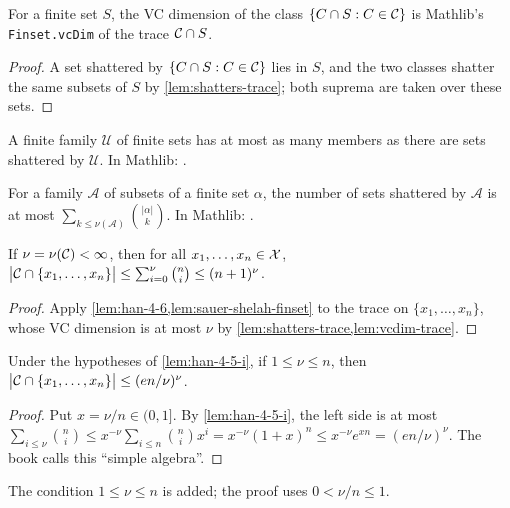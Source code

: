 \begin{lemma}
  \label{lem:vcdim-trace}
  For a finite set $S$, the VC dimension of the class $\{C\cap S:C\in\mathcal{C}\}$ is Mathlib's \texttt{Finset.vcDim} of the trace $\mathcal{C}\cap S$.
\end{lemma}
\begin{proof}
  A set shattered by $\{C\cap S:C\in\mathcal{C}\}$ lies in $S$, and the two classes shatter the same subsets of $S$ by \cref{lem:shatters-trace}; both suprema are taken over these sets.
\end{proof}

\begin{lemma}
  \label{lem:han-4-6}
  \mathlibok
  A finite family $\mathcal U$ of finite sets has at most as many members as there are sets shattered by $\mathcal U$.
  In Mathlib: .
\end{lemma}

\begin{lemma}
  \label{lem:sauer-shelah-finset}
  \mathlibok
  For a family $\mathcal A$ of subsets of a finite set $\alpha$, the number of sets shattered by $\mathcal A$ is at most $\sum_{k\le\nu(\mathcal A)}\binom{|\alpha|}{k}$.
  In Mathlib: .
\end{lemma}

\begin{lemma}
  \label{lem:han-4-5-i}
  If $\nu=\nu(\mathcal{C})<\infty$, then for all $x_1,\dots,x_n\in\mathcal{X}$,
  $\bigl|\mathcal{C}\cap\{x_1,\dots,x_n\}\bigr|\le\sum_{i=0}^{\nu}\binom ni\le(n+1)^\nu$.
\end{lemma}
\begin{proof}
  Apply \cref{lem:han-4-6,lem:sauer-shelah-finset} to the trace on $\{x_1,\dots,x_n\}$, whose VC dimension is at most $\nu$ by \cref{lem:shatters-trace,lem:vcdim-trace}.
\end{proof}

\begin{lemma}
  \label{lem:han-4-5-ii}
  Under the hypotheses of \cref{lem:han-4-5-i}, if $1\le\nu\le n$, then $\bigl|\mathcal{C}\cap\{x_1,\dots,x_n\}\bigr|\le(en/\nu)^\nu$.
\end{lemma}
\begin{proof}
  Put $x=\nu/n\in(0,1]$. By \cref{lem:han-4-5-i}, the left side is at most $\sum_{i\le\nu}\binom ni\le x^{-\nu}\sum_{i\le n}\binom nix^i=x^{-\nu}(1+x)^n\le x^{-\nu}e^{xn}=(en/\nu)^\nu$. The book calls this ``simple algebra''.
\end{proof}
\begin{remark}
  The condition $1\le\nu\le n$ is added; the proof uses $0<\nu/n\le1$.
\end{remark}

